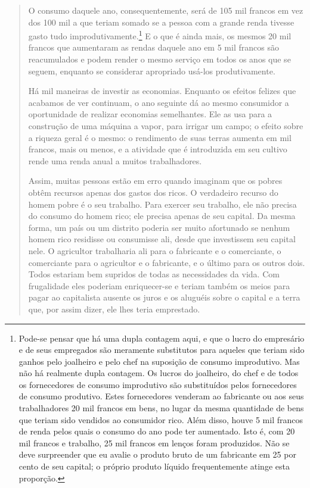 \documentclass[12pt]{article}
\begin{document}
\begin{quote}
O consumo daquele ano, consequentemente, será de 105 mil francos em vez dos 100 mil a que teriam somado se a pessoa com a grande renda tivesse gasto tudo improdutivamente.\footnote{Pode-se pensar que há uma dupla contagem aqui, e que o lucro do empresário e de seus empregados são meramente substitutos para aqueles que teriam sido ganhos pelo joalheiro e pelo chef na suposição de consumo improdutivo. Mas não há realmente dupla contagem. Os lucros do joalheiro, do chef e de todos os fornecedores de consumo improdutivo são substituídos pelos fornecedores de consumo produtivo. Estes fornecedores venderam ao fabricante ou aos seus trabalhadores 20 mil francos em bens, no lugar da mesma quantidade de bens que teriam sido vendidos ao consumidor rico. Além disso, houve 5 mil francos de renda pelos quais o consumo do ano pode ter aumentado. Isto é, com 20 mil francos e trabalho, 25 mil francos em lenços foram produzidos. Não se deve surpreender que eu avalie o produto bruto de um fabricante em 25 por cento de seu capital; o próprio produto líquido frequentemente atinge esta proporção.} E o que é ainda mais, os mesmos 20 mil francos que aumentaram as rendas daquele ano em 5 mil francos são reacumulados e podem render o mesmo serviço em todos os anos que se seguem, enquanto se considerar apropriado usá-los produtivamente.

Há mil maneiras de investir as economias. Enquanto os efeitos felizes que acabamos de ver continuam, o ano seguinte dá ao mesmo consumidor a oportunidade de realizar economias semelhantes. Ele as usa para a construção de uma máquina a vapor, para irrigar um campo; o efeito sobre a riqueza geral é o mesmo: o rendimento de suas terras aumenta em mil francos, mais ou menos, e a atividade que é introduzida em seu cultivo rende uma renda anual a muitos trabalhadores.

Assim, muitas pessoas estão em erro quando imaginam que os pobres obtêm recursos apenas dos gastos dos ricos. O verdadeiro recurso do homem pobre é o seu trabalho. Para exercer seu trabalho, ele não precisa do consumo do homem rico; ele precisa apenas de seu capital. Da mesma forma, um país ou um distrito poderia ser muito afortunado se nenhum homem rico residisse ou consumisse ali, desde que investissem seu capital nele. O agricultor trabalharia ali para o fabricante e o comerciante, o comerciante para o agricultor e o fabricante, e o último para os outros dois. Todos estariam bem supridos de todas as necessidades da vida. Com frugalidade eles poderiam enriquecer-se e teriam também os meios para pagar ao capitalista ausente os juros e os aluguéis sobre o capital e a terra que, por assim dizer, ele lhes teria emprestado.


\end{quote}
\end{document}
